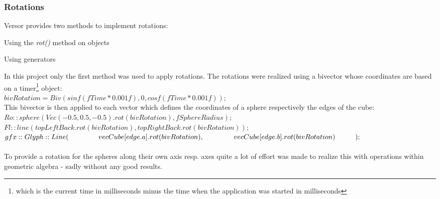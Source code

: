 \documentclass[pdftex,12pt,a4paper]{article}
\begin{document}
\subsubsection{Rotations}
Versor provides two methods to implement rotations:\\
\begin{compactitem}
	\item Using the \textit{rot()} method on objects
	\item Using generators
\end{compactitem}
\vspace*{2mm}
\noindent\hspace*{0mm}In this project only the first method was used to apply rotations. The rotations were realized using a \gls{bivector} whose coordinates are based on a timer\footnote{which is the current time in milliseconds minus the time when the application was started in milliseconds} object:\vspace*{5mm}\\
\noindent\hspace*{10mm}\vspace*{5mm} $ bivRotation = Biv(sinf(fTime * 0.001f), 0, cosf(fTime * 0.001f)); $\\
\noindent\hspace*{0mm}This bivector is then applied to each vector which defines the coordinates of a sphere respectively the edges of the cube:\vspace*{5mm}\\
\noindent\hspace*{10mm}\vspace*{5mm} $ Ro::sphere(Vec(-0.5, 0.5, -0.5).rot(bivRotation), fSphereRadius); $\\
\noindent\hspace*{10mm}\vspace*{5mm} $  Fl::line(topLeftBack.rot(bivRotation), topRightBack.rot(bivRotation)); $\\
\noindent\hspace*{10mm}$ gfx::Glyph::Line(\\
	\noindent\hspace*{15mm}vecCube[edge.a].rot(bivRotation),\\
	\noindent\hspace*{15mm}vecCube[edge.b].rot(bivRotation)\\
\noindent\hspace*{10mm}); $\\
\\
\noindent\hspace*{0mm}To provide a rotation for the spheres along their own axis resp. axes quite a lot of effort was made to realize this with operations within geometric algebra - sadly without any good results.\\
\end{document}
